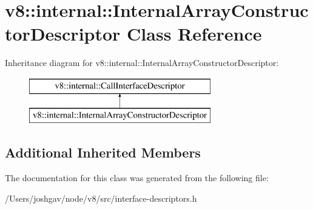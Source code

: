\hypertarget{classv8_1_1internal_1_1_internal_array_constructor_descriptor}{}\section{v8\+:\+:internal\+:\+:Internal\+Array\+Constructor\+Descriptor Class Reference}
\label{classv8_1_1internal_1_1_internal_array_constructor_descriptor}
Inheritance diagram for v8\+:\+:internal\+:\+:Internal\+Array\+Constructor\+Descriptor\+:\begin{figure}[H]
\begin{center}
\leavevmode
\includegraphics[height=2.000000cm]{classv8_1_1internal_1_1_internal_array_constructor_descriptor}
\end{center}
\end{figure}
\subsection*{Additional Inherited Members}


The documentation for this class was generated from the following file\+:\begin{DoxyCompactItemize}
\item 
/\+Users/joshgav/node/v8/src/interface-\/descriptors.\+h\end{DoxyCompactItemize}
